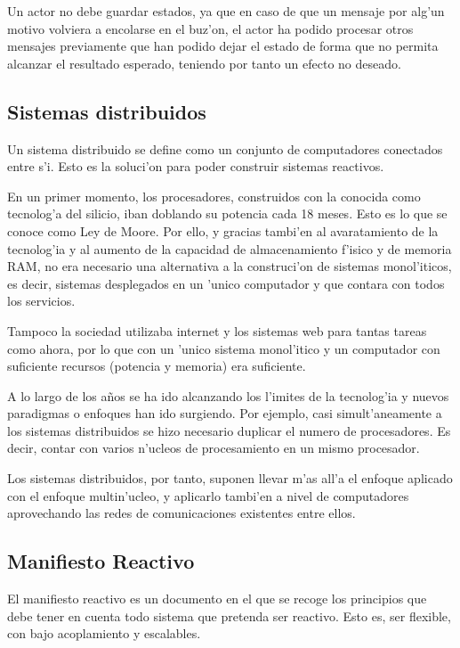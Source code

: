 \documentclass[12pt]{article}
\begin{document}
Un actor no debe guardar estados, ya que en caso de que un mensaje por alg'un motivo
volviera a encolarse en el buz'on, el actor ha podido procesar otros mensajes previamente
que han podido dejar el estado de forma que no permita alcanzar el resultado esperado, teniendo
por tanto un efecto no deseado.

\subsection{Sistemas distribuidos}
\label{sub:sistemas distribuidos}
Un sistema distribuido se define como un conjunto de computadores conectados entre s'i. Esto
es la soluci'on para poder construir sistemas reactivos.

En un primer momento, los procesadores, construidos con la conocida como tecnolog'a del
silicio, iban doblando su potencia cada 18 meses. Esto es lo que se conoce como Ley de Moore.
Por ello, y gracias tambi'en al avaratamiento de la tecnolog'ia y al aumento de la capacidad de
almacenamiento f'isico y de memoria RAM, no era necesario una alternativa a la construci'on de sistemas
monol'iticos, es decir, sistemas desplegados en un 'unico computador y que contara con
todos los servicios.

Tampoco la sociedad utilizaba internet y los sistemas web para tantas tareas como ahora, por lo
que con un 'unico sistema monol'itico y un computador con suficiente recursos (potencia y memoria)
era suficiente.

A lo largo de los años se ha ido alcanzando los l'imites de la tecnolog'ia y nuevos paradigmas o
enfoques han ido surgiendo. Por ejemplo, casi simult'aneamente a los sistemas distribuidos se
hizo necesario duplicar el numero de procesadores. Es decir, contar con varios n'ucleos de
procesamiento en un mismo procesador.

Los sistemas distribuidos, por tanto, suponen llevar m'as all'a el enfoque aplicado con el enfoque
multin'ucleo, y aplicarlo tambi'en a nivel de computadores aprovechando las redes de comunicaciones
existentes entre ellos.

\subsection{Manifiesto Reactivo}
\label{sub:manifiesto reactivo}
El manifiesto reactivo es un documento en el que se recoge los principios que debe
tener en cuenta todo sistema que pretenda ser reactivo. Esto es, ser flexible, con bajo
acoplamiento y escalables.
\end{document}
